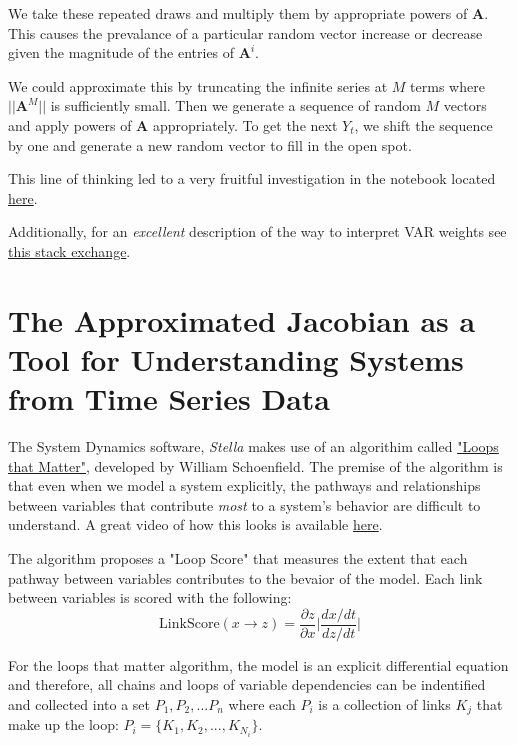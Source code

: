 \documentclass{article}
\begin{document}
        We take these repeated draws and multiply them by appropriate
        powers of $\bm{A}$. This causes the prevalance of a particular
        random vector increase or decrease given the magnitude of the 
        entries of $\bm{A}^i$.

        We could approximate this by truncating the infinite series
        at $M$ terms where $||\bm{A}^M||$ is sufficiently small.
        Then we generate a sequence of random $M$ vectors and apply 
        powers of $\bm{A}$ appropriately. To get the next $Y_t$, we shift
        the sequence by one and generate a new random vector to fill in 
        the open spot.

        This line of thinking led to a very fruitful investigation in
        the notebook located 
        \href{https://github.com/djpasseyjr/graphinference/blob/main/Notebooks/Jupyter/VARAlternateForms.ipynb}{here}.
        
        Additionally, for an \textit{excellent} description of the way to interpret VAR weights see
        \href{https://stats.stackexchange.com/questions/40905/arima-model-interpretation/63072#63072}{this stack exchange}.

        \section{The Approximated Jacobian as a Tool for Understanding Systems from Time Series Data}

        The System Dynamics software, \textit{Stella} makes use of an algorithim called 
        \href{https://onlinelibrary.wiley.com/doi/full/10.1002/sdr.1658}{"Loops that Matter"},
        developed by William Schoenfield. The premise of the algorithm is that even when we 
        model a system explicitly,
        the pathways and relationships between variables that contribute \textit{most} to
        a system's behavior are difficult to understand. A great video of how
        this looks is available \href{https://youtu.be/DCr68OEWzec?t=612}{here}.

        The algorithm proposes a "Loop Score" that measures the extent
        that each pathway between variables contributes to the bevaior of the model. 
        Each link between variables is scored with the following:
        \[
            \text{LinkScore}(x \rightarrow z) = \frac{\partial z}{\partial x} \Big| \frac{ dx/dt }{ dz/dt } \Big|
        \]

        For the loops that matter algorithm, the model is an explicit differential equation
        and therefore, all chains and loops of variable dependencies can be indentified and
        collected into a set $P_1, P_2, ... P_n$ where each $P_i$ is a collection of links $K_j$ that
        make up the loop: $P_i = \{K_1, K_2, ..., K_{N_i} \}.$
\end{document}
